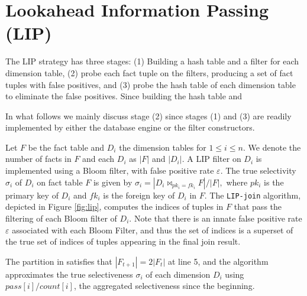 \documentclass[10pt]{article}
\newcommand{\JOIN}{\bowtie}
\begin{document}
\section{Lookahead Information Passing (LIP)}

The LIP strategy has three stages: (1) Building a hash table and a filter for each dimension table, (2) probe each fact tuple on the filters, producing a set of fact tuples with false positives, and (3) probe the hash table of each dimension table to eliminate the false positives. Since building the hash table and 


In what follows we mainly discuss stage (2) since stages (1) and (3) are readily implemented by either the database engine or the filter constructors.

Let $F$ be the fact table and $D_i$ the dimension tables for $1 \leq i \leq n$. We denote the number of facts in $F$ and each $D_i$ as $|F|$ and $|D_i|$. A LIP filter on $D_i$ is implemented using a Bloom filter, with false positive rate $\varepsilon$. The true selectivity $\sigma_i$ of $D_i$ on fact table $F$ is given by $\sigma_i = |D_i \JOIN_{pk_i = fk_i} F| / |F|,$ where $pk_i$ is the primary key of $D_i$ and $fk_i$ is the foreign key of $D_i$ in $F$. The \texttt{LIP-join} algorithm, depicted in Figure \ref{fig:lip}, computes the indices of tuples in $F$ that pass the filtering of each Bloom filter of $D_i$. Note that there is an innate false positive rate $\varepsilon$ associated with each Bloom Filter, and thus the set of indices is a superset of the true set of indices of tuples appearing in the final join result.

The partition in \cite{zhu2017looking} satisfies that $|F_{t+1}| = 2|F_{t}|$ at line 5, and the algorithm approximates the true selectiveness $\sigma_i$ of each dimension $D_i$ using $pass[i]/count[i]$, the aggregated selectiveness since the beginning.
\end{document}
